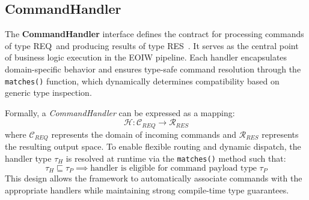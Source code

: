 

\subsection{CommandHandler}

The \textbf{CommandHandler} interface defines the contract for processing commands of type \textlangle REQ\textrangle\ and producing results of type \textlangle RES\textrangle\ . It serves as the central point of business logic execution in the EOIW pipeline. Each handler encapsulates domain-specific behavior and ensures type-safe command resolution through the \texttt{matches()} function, which dynamically determines compatibility based on generic type inspection. 

Formally, a \emph{CommandHandler} can be expressed as a mapping:
\[
\mathcal{H}: \mathcal{C}_{REQ} \rightarrow \mathcal{R}_{RES}
\]
where $\mathcal{C}_{REQ}$ represents the domain of incoming commands and $\mathcal{R}_{RES}$ represents the resulting output space.  
To enable flexible routing and dynamic dispatch, the handler type $\tau_H$ is resolved at runtime via the \texttt{matches()} method such that:
\[
\tau_H \sqsubseteq \tau_P \implies \text{handler is eligible for command payload type } \tau_P
\]
This design allows the framework to automatically associate commands with the appropriate handlers while maintaining strong compile-time type guarantees.

